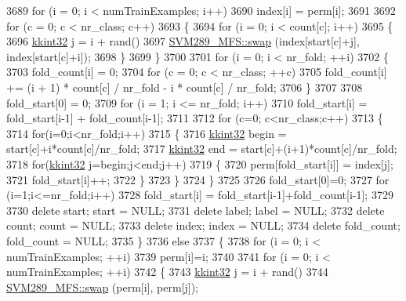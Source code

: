 \begin{DoxyCode}
3689     \textcolor{keywordflow}{for}  (i = 0;  i < numTrainExamples;  i++)
3690       index[i] = perm[i];
3691 
3692     \textcolor{keywordflow}{for} (c = 0;  c < nr\_class;  c++) 
3693     \{
3694       \textcolor{keywordflow}{for}  (i = 0;  i < count[c];  i++)
3695       \{
3696         \hyperlink{namespace_k_k_b_a8fa4952cc84fda1de4bec1fbdd8d5b1b}{kkint32} j = i + rand() %
3697         \hyperlink{namespace_s_v_m289___m_f_s_a195322b74181af0322d4e086a529c096}{SVM289\_MFS::swap} (index[start[c]+j], index[start[c]+i]);
3698       \}
3699     \}
3700 
3701     \textcolor{keywordflow}{for}  (i = 0;  i < nr\_fold;  ++i)
3702     \{
3703       fold\_count[i] = 0;
3704       \textcolor{keywordflow}{for}  (c = 0;  c < nr\_class;  ++c)
3705         fold\_count[i] += (i + 1) * count[c] / nr\_fold - i * count[c] / nr\_fold;
3706     \}
3707 
3708     fold\_start[0] = 0;
3709     \textcolor{keywordflow}{for} (i = 1;  i <= nr\_fold;  i++)
3710       fold\_start[i] = fold\_start[i-1] + fold\_count[i-1];
3711 
3712     \textcolor{keywordflow}{for} (c=0; c<nr\_class;c++)
3713     \{
3714       \textcolor{keywordflow}{for}(i=0;i<nr\_fold;i++)
3715       \{
3716         \hyperlink{namespace_k_k_b_a8fa4952cc84fda1de4bec1fbdd8d5b1b}{kkint32} begin = start[c]+i*count[c]/nr\_fold;
3717         \hyperlink{namespace_k_k_b_a8fa4952cc84fda1de4bec1fbdd8d5b1b}{kkint32} end = start[c]+(i+1)*count[c]/nr\_fold;
3718         \textcolor{keywordflow}{for}(\hyperlink{namespace_k_k_b_a8fa4952cc84fda1de4bec1fbdd8d5b1b}{kkint32} j=begin;j<end;j++)
3719         \{
3720           perm[fold\_start[i]] = index[j];
3721           fold\_start[i]++;
3722         \}
3723       \}
3724     \}
3725 
3726     fold\_start[0]=0;
3727     \textcolor{keywordflow}{for} (i=1;i<=nr\_fold;i++)
3728       fold\_start[i] = fold\_start[i-1]+fold\_count[i-1];
3729 
3730     \textcolor{keyword}{delete} start;        start = NULL;
3731     \textcolor{keyword}{delete} label;       label = NULL;
3732     \textcolor{keyword}{delete} count;        count = NULL;
3733     \textcolor{keyword}{delete} index;       index = NULL;
3734     \textcolor{keyword}{delete} fold\_count;  fold\_count = NULL;
3735   \}
3736   \textcolor{keywordflow}{else}
3737   \{
3738     \textcolor{keywordflow}{for} (i = 0;  i < numTrainExamples;  ++i)
3739       perm[i]=i;
3740 
3741     \textcolor{keywordflow}{for} (i = 0;  i < numTrainExamples;  ++i)
3742     \{
3743       \hyperlink{namespace_k_k_b_a8fa4952cc84fda1de4bec1fbdd8d5b1b}{kkint32} j = i + rand() %
3744       \hyperlink{namespace_s_v_m289___m_f_s_a195322b74181af0322d4e086a529c096}{SVM289\_MFS::swap} (perm[i], perm[j]);

\end{DoxyCode}
